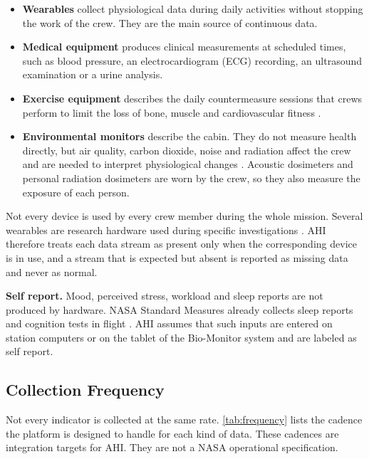 \begin{itemize}
\item \textbf{Wearables} collect physiological data during daily activities without stopping the work of the crew. They are the main source of continuous data.
\item \textbf{Medical equipment} produces clinical measurements at scheduled times, such as blood pressure, an electrocardiogram (ECG) recording, an ultrasound examination or a urine analysis.
\item \textbf{Exercise equipment} describes the daily countermeasure sessions that crews perform to limit the loss of bone, muscle and cardiovascular fitness \cite{nasa_jsc_exercise_countermeasures}.
\item \textbf{Environmental monitors} describe the cabin. They do not measure health directly, but air quality, carbon dioxide, noise and radiation affect the crew and are needed to interpret physiological changes \cite{nasa_toxicology_envchem,nasa_ochmo_tb035_acoustics}. Acoustic dosimeters and personal radiation dosimeters are worn by the crew, so they also measure the exposure of each person.
\end{itemize}

Not every device is used by every crew member during the whole mission. Several wearables are research hardware used during specific investigations \cite{nasa_wearable_tech_iss,nasa_sleep_on_station}. AHI therefore treats each data stream as present only when the corresponding device is in use, and a stream that is expected but absent is reported as missing data and never as normal.

\medskip\noindent\textbf{Self report.} Mood, perceived stress, workload and sleep reports are not produced by hardware. NASA Standard Measures already collects sleep reports and cognition tests in flight \cite{nasa_standard_measures}. AHI assumes that such inputs are entered on station computers or on the tablet of the Bio-Monitor system and are labeled as self report.

\subsection{Collection Frequency}
\label{subsec:collection-frequency}

Not every indicator is collected at the same rate. \ref{tab:frequency} lists the cadence the platform is designed to handle for each kind of data. These cadences are integration targets for AHI. They are not a NASA operational specification.

